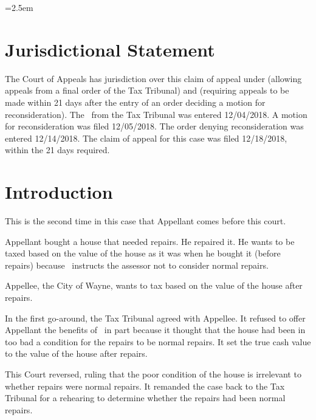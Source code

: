 \documentclass[12pt,\documentclassflag]{michiganCourtOfAppealsBrief}
\def\mathieuGast{\pincite[l]{MCL}{211.27(2)}}
\begin{document}
\newpage
\tableofauthorities

\pagestyle{plain}



\parindent=2.5em 
\doublespacing

\section{Jurisdictional Statement}

The Court of Appeals has jurisdiction over this claim of appeal under  (allowing appeals from a final order of the Tax Tribunal) and  (requiring appeals to be made within 21 days after the entry of an order deciding a motion for reconsideration). The \FOJ\ from the Tax Tribunal was entered 12/04/2018. A motion for reconsideration was filed 12/05/2018. The order denying reconsideration was entered 12/14/2018. The claim of appeal for this case was filed 12/18/2018, within the 21 days required.

\section{Introduction}

This is the second time in this case that Appellant comes before this court. 

Appellant bought a house that needed repairs. He repaired it. He wants to be taxed based on the value of the house as it was when he bought it (before repairs) because  \mathieuGast\ instructs the assessor not to consider normal repairs. 

Appellee, the City of Wayne, wants to tax based on the value of the house after repairs.

In the first go-around, the Tax Tribunal agreed with Appellee. It refused to offer Appellant the benefits of \mathieuGast\ in part because it thought that the house had been in too bad a condition for the repairs to be normal repairs. It set the true cash value to the value of the house after repairs.

This Court reversed, ruling that the poor condition of the house is irrelevant to whether repairs were normal repairs. It remanded the case back to the Tax Tribunal for a rehearing to determine whether the repairs had been normal repairs. 
\end{document}
